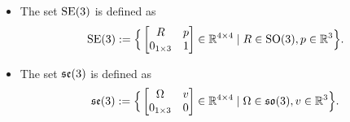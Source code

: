 \begin{itemize}
\item The set $\textrm{SE}(3)$ is defined as
\begin{align}
\textrm{SE}(3) :=  
\Big\{ 
\begin{bmatrix} R & p \\ 0_{1\times3} & 1 \end{bmatrix} \in \mathbb{R}^{4 \times 4} \mid 
R \in \textrm{SO}(3), p \in \mathbb{R}^3
\Big\} .
\end{align}
\item The set $\mathfrak{se}(3)$ is defined as
\begin{align}
\mathfrak{se}(3) :=  
\Big\{ 
\begin{bmatrix} \Omega & v \\ 0_{1\times3} & 0 \end{bmatrix} \in \mathbb{R}^{4 \times 4}  \mid \Omega \in \mathfrak{so}(3), v \in \mathbb{R}^3 
\Big\}.
\end{align}



\end{itemize}
